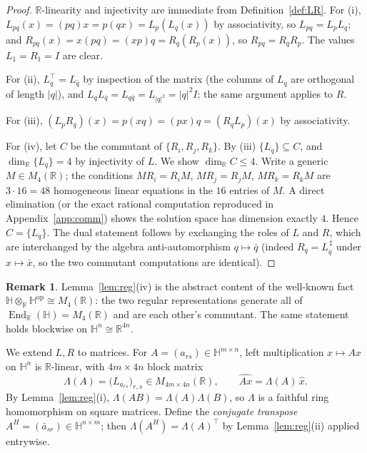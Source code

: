 \documentclass{amsart}
\theoremstyle{definition}
\newtheorem{remark}[theorem]{Remark}
\newcommand{\HH}{\mathbb{H}}
\newcommand{\RR}{\mathbb{R}}
\DeclareMathOperator{\End}{End}
\begin{document}
\begin{proof}
$\RR$-linearity and injectivity are immediate from
Definition~\ref{def:LR}. For (i),
$L_{pq}(x)=(pq)x=p(qx)=L_p(L_q(x))$ by associativity, so $L_{pq}=L_pL_q$;
and $R_{pq}(x)=x(pq)=(xp)q=R_q(R_p(x))$, so $R_{pq}=R_qR_p$. The values
$L_1=R_1=I$ are clear.

For (ii), $L_q^{\!\top}=L_{\bar q}$ by inspection of the matrix (the
columns of $L_q$ are orthogonal of length $|q|$), and
$L_qL_{\bar q}=L_{q\bar q}=L_{|q|^2}=|q|^2I$; the same argument applies to
$R$.

For (iii), $(L_pR_q)(x)=p(xq)=(px)q=(R_qL_p)(x)$ by associativity.

For (iv), let $C$ be the commutant of $\{R_i,R_j,R_k\}$. By (iii)
$\{L_q\}\subseteq C$, and $\dim_\RR\{L_q\}=4$ by injectivity of $L$. We
show $\dim_\RR C\le4$. Write a generic $M\in M_4(\RR)$; the conditions
$MR_i=R_iM$, $MR_j=R_jM$, $MR_k=R_kM$ are $3\cdot 16=48$ homogeneous
linear equations in the $16$ entries of $M$. A direct elimination (or
the exact rational computation reproduced in Appendix~\ref{app:comm})
shows the solution space has dimension exactly $4$. Hence $C=\{L_q\}$.
The dual statement follows by exchanging the roles of $L$ and $R$, which
are interchanged by the algebra anti-automorphism $q\mapsto\bar q$
(indeed $R_q=L_{\bar q}^{\,\sharp}$ under $x\mapsto\bar x$, so the two
commutant computations are identical).
\end{proof}

\begin{remark}
Lemma~\ref{lem:reg}(iv) is the abstract content of the well-known fact
$\HH\otimes_\RR\HH^{\mathrm{op}}\cong M_4(\RR)$: the two regular
representations generate all of $\End_\RR(\HH)=M_4(\RR)$ and are each
other's commutant. The same statement holds blockwise on
$\HH^n\cong\RR^{4n}$.
\end{remark}

We extend $L,R$ to matrices. For $A=(a_{rs})\in\HH^{m\times n}$, left
multiplication $x\mapsto Ax$ on $\HH^n$ is $\RR$-linear, with
$4m\times 4n$ block matrix
\begin{equation}\label{eq:Lblock}
\Lambda(A)=\bigl(L_{a_{rs}}\bigr)_{r,s}\in M_{4m\times4n}(\RR),
\qquad \widehat{Ax}=\Lambda(A)\,\widehat x .
\end{equation}
By Lemma~\ref{lem:reg}(i), $\Lambda(AB)=\Lambda(A)\Lambda(B)$, so
$\Lambda$ is a faithful ring homomorphism on square matrices. Define the
\emph{conjugate transpose} $A^{H}=(\bar a_{sr})\in\HH^{n\times m}$; then
$\Lambda(A^{H})=\Lambda(A)^{\!\top}$ by
Lemma~\ref{lem:reg}(ii) applied entrywise.
\end{document}
